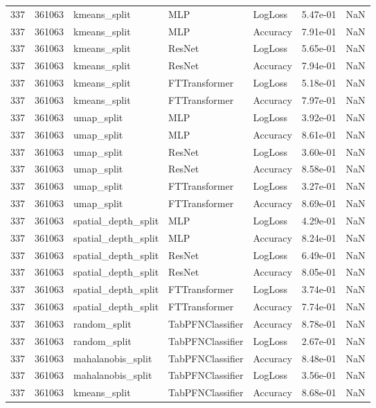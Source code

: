 \begin{tabular}{rrlllrr}
337 & 361063 & kmeans\_split & MLP & LogLoss & 5.47e-01 & NaN \\
337 & 361063 & kmeans\_split & MLP & Accuracy & 7.91e-01 & NaN \\
337 & 361063 & kmeans\_split & ResNet & LogLoss & 5.65e-01 & NaN \\
337 & 361063 & kmeans\_split & ResNet & Accuracy & 7.94e-01 & NaN \\
337 & 361063 & kmeans\_split & FTTransformer & LogLoss & 5.18e-01 & NaN \\
337 & 361063 & kmeans\_split & FTTransformer & Accuracy & 7.97e-01 & NaN \\
337 & 361063 & umap\_split & MLP & LogLoss & 3.92e-01 & NaN \\
337 & 361063 & umap\_split & MLP & Accuracy & 8.61e-01 & NaN \\
337 & 361063 & umap\_split & ResNet & LogLoss & 3.60e-01 & NaN \\
337 & 361063 & umap\_split & ResNet & Accuracy & 8.58e-01 & NaN \\
337 & 361063 & umap\_split & FTTransformer & LogLoss & 3.27e-01 & NaN \\
337 & 361063 & umap\_split & FTTransformer & Accuracy & 8.69e-01 & NaN \\
337 & 361063 & spatial\_depth\_split & MLP & LogLoss & 4.29e-01 & NaN \\
337 & 361063 & spatial\_depth\_split & MLP & Accuracy & 8.24e-01 & NaN \\
337 & 361063 & spatial\_depth\_split & ResNet & LogLoss & 6.49e-01 & NaN \\
337 & 361063 & spatial\_depth\_split & ResNet & Accuracy & 8.05e-01 & NaN \\
337 & 361063 & spatial\_depth\_split & FTTransformer & LogLoss & 3.74e-01 & NaN \\
337 & 361063 & spatial\_depth\_split & FTTransformer & Accuracy & 7.74e-01 & NaN \\
337 & 361063 & random\_split & TabPFNClassifier & Accuracy & 8.78e-01 & NaN \\
337 & 361063 & random\_split & TabPFNClassifier & LogLoss & 2.67e-01 & NaN \\
337 & 361063 & mahalanobis\_split & TabPFNClassifier & Accuracy & 8.48e-01 & NaN \\
337 & 361063 & mahalanobis\_split & TabPFNClassifier & LogLoss & 3.56e-01 & NaN \\
337 & 361063 & kmeans\_split & TabPFNClassifier & Accuracy & 8.68e-01 & NaN \\

\end{tabular}
